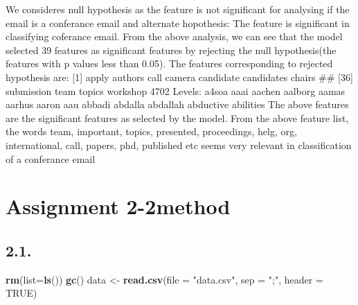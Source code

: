 \documentclass[]{article}
\newenvironment{Shaded}{\begin{snugshade}}{\end{snugshade}}
\newcommand{\KeywordTok}[1]{\textcolor[rgb]{0.13,0.29,0.53}{\textbf{#1}}}
\newcommand{\DataTypeTok}[1]{\textcolor[rgb]{0.13,0.29,0.53}{#1}}
\newcommand{\StringTok}[1]{\textcolor[rgb]{0.31,0.60,0.02}{#1}}
\newcommand{\OtherTok}[1]{\textcolor[rgb]{0.56,0.35,0.01}{#1}}
\newcommand{\NormalTok}[1]{#1}
\begin{document}
We consideres null hypothesis as the feature is not significant for
analysing if the email is a conferance email and alternate hopothesis:
The feature is significant in classifying coferance email. From the
above analysis, we can see that the model selected 39 features as
significant features by rejecting the null hypothesis(the features with
p values less than 0.05). The features corresponding to rejected
hypothesis are: {[}1{]} apply authors call camera candidate candidates
chairs \#\# {[}36{]} submission team topics workshop 4702 Levels: a4soa
aaai aachen aalborg aamas aarhus aaron aau abbadi abdalla abdallah
abductive abilities The above features are the significant features as
selected by the model. From the above feature list, the words team,
important, topics, presented, proceedings, helg, org, international,
call, papers, phd, published etc seems very relevant in classification
of a conferance email

\section{Assignment 2-2method}\label{assignment-2-2method}

\subsection{2.1.}\label{section}

\begin{Shaded}
\begin{Highlighting}[]
\KeywordTok{rm}\NormalTok{(}\DataTypeTok{list=}\KeywordTok{ls}\NormalTok{())}
\KeywordTok{gc}\NormalTok{()}
\NormalTok{data <-}\StringTok{ }\KeywordTok{read.csv}\NormalTok{(}\DataTypeTok{file =} \StringTok{"data.csv"}\NormalTok{, }\DataTypeTok{sep =} \StringTok{";"}\NormalTok{, }\DataTypeTok{header =} \OtherTok{TRUE}\NormalTok{)}
\end{Highlighting}
\end{Shaded}
\end{document}

